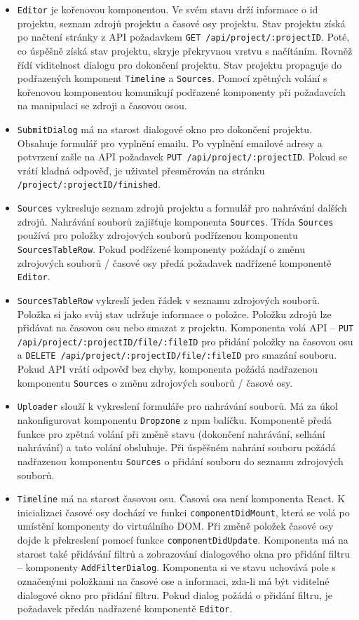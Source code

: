 \begin{itemize}
\item \texttt{Editor} je kořenovou komponentou.  Ve svém stavu drží informace o id projektu, seznam zdrojů projektu a časové osy projektu. Stav projektu získá po načtení stránky z API požadavkem \texttt{GET /api/project/:projectID}. Poté, co úspěšně získá stav projektu, skryje překryvnou vrstvu s načítáním. Rovněž řídí viditelnost dialogu pro dokončení projektu. Stav projektu propaguje do podřazených komponent \texttt{Timeline} a \texttt{Sources}. Pomocí zpětných volání s kořenovou komponentou komunikují podřazené komponenty při požadavcích na manipulaci se zdroji a časovou osou.
\item \texttt{SubmitDialog} má na starost dialogové okno pro dokončení projektu. Obsahuje formulář pro vyplnění emailu. Po vyplnění emailové adresy a potvrzení zašle na API požadavek \texttt{PUT /api/project/:projectID}. Pokud se vrátí kladná odpověď, je uživatel přesměrován na stránku \texttt{/project/:projectID/finished}.
\item \texttt{Sources} vykresluje seznam zdrojů projektu a formulář pro nahrávání dalších zdrojů. Nahrávání souborů zajišťuje komponenta \texttt{Sources}. Třída \texttt{Sources} používá pro položky zdrojových souborů podřízenou komponentu \texttt{SourcesTableRow}. Pokud podřízené komponenty požádají o změnu zdrojových souborů / časové osy předá požadavek nadřízené komponentě \texttt{Editor}.
\item \texttt{SourcesTableRow} vykreslí jeden řádek v seznamu zdrojových souborů. Položka si jako svůj stav udržuje informace o položce. Položku zdrojů lze přidávat na časovou osu nebo smazat z projektu. Komponenta volá API -- \texttt{PUT /api/project/:projectID/file/:fileID} pro přidání položky na časovou osu a \texttt{DELETE /api/project/:projectID/file/:fileID} pro smazání souboru. Pokud API vrátí odpověď bez chyby, komponenta požádá nadřazenou komponentu \texttt{Sources} o změnu zdrojových souborů / časové osy.
\item \texttt{Uploader} slouží k vykreslení formuláře pro nahrávání souborů. Má za úkol nakonfigurovat komponentu \texttt{Dropzone} z npm balíčku. Komponentě předá funkce pro zpětná volání při změně stavu (dokončení nahrávání, selhání nahrávání) a tato volání obsluhuje. Při úspěšném nahrání souboru požádá nadřazenou komponentu \texttt{Sources} o přidání souboru do seznamu zdrojových souborů.
\item \texttt{Timeline} má na starost časovou osu. Časová osa není komponenta React. K inicializaci časové osy dochází ve funkci \texttt{componentDidMount}, která se volá po umístění komponenty do virtuálního DOM. Při změně položek časové osy dojde k překreslení pomocí funkce \texttt{componentDidUpdate}. Komponenta má na starost také přidávání filtrů a zobrazování dialogového okna pro přidání filtru -- komponenty \texttt{AddFilterDialog}. Komponenta si ve stavu uchovává pole s označenými položkami na časové ose a informaci, zda-li má být viditelné dialogové okno pro přidání filtru. Pokud dialog požádá o přidání filtru, je požadavek předán nadřazené komponentě \texttt{Editor}.

\end{itemize}

